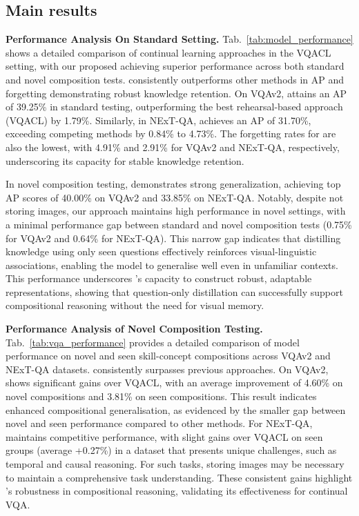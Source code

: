 

\subsection{Main results}
\label{sec:mainresults}
\noindent\textbf{Performance Analysis On Standard Setting. }Tab.~\ref{tab:model_performance} shows a detailed comparison of continual learning approaches in the VQACL setting, with our proposed \qstmethodshort{} achieving superior performance across both standard and novel composition tests. \qstmethodshort{} consistently outperforms other methods in AP and forgetting demonstrating robust knowledge retention. On VQAv2, \qstmethodshort{} attains an AP of 39.25\% in standard testing, outperforming the best rehearsal-based approach (VQACL) by 1.79\%. Similarly, in NExT-QA, \qstmethodshort{} achieves an AP of 31.70\%, exceeding competing methods by 0.84\% to 4.73\%. The forgetting rates for \qstmethodshort{} are also the lowest, with 4.91\% and 2.91\% for VQAv2 and NExT-QA, respectively, underscoring its capacity for stable knowledge retention.

In novel composition testing, \qstmethodshort{} demonstrates strong generalization, achieving top AP scores of 40.00\% on VQAv2 and 33.85\% on NExT-QA. Notably, despite not storing images, our approach maintains high performance in novel settings, with a minimal performance gap between standard and novel composition tests (0.75\% for VQAv2 and 0.64\% for NExT-QA). This narrow gap indicates that distilling knowledge using only seen questions effectively reinforces visual-linguistic associations, enabling the model to generalise well even in unfamiliar contexts. This performance underscores \qstmethodshort{}'s capacity to construct robust, adaptable representations, showing that question-only distillation can successfully support compositional reasoning without the need for visual memory.

\noindent\textbf{Performance Analysis of Novel Composition Testing. }Tab.~\ref{tab:vqa_performance} provides a detailed comparison of model performance on novel and seen skill-concept compositions across VQAv2 and NExT-QA datasets. \qstmethodshort{} consistently surpasses previous approaches. On VQAv2, \qstmethodshort{} shows significant gains over VQACL, with an average improvement of 4.60\% on novel compositions and 3.81\% on seen compositions. This result indicates enhanced compositional generalisation, as evidenced by the smaller gap between novel and seen performance compared to other methods. For NExT-QA, \qstmethodshort{} maintains competitive performance, with slight gains over VQACL on seen groups (average +0.27\%) in a dataset that presents unique challenges, such as temporal and causal reasoning. For such tasks, storing images may be necessary to maintain a comprehensive task understanding. These consistent gains highlight \qstmethodshort{}'s robustness in compositional reasoning, validating its effectiveness for continual VQA. 

